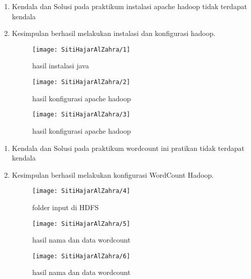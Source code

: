 
\begin{enumerate}
\item Kendala dan Solusi
\newline pada praktikum instalasi apache hadoop tidak terdapat kendala 

\item Kesimpulan
\newline berhasil melakukan instalasi dan konfigurasi hadoop.
\begin{figure}[!ht]
\texttt{[image: SitiHajarAlZahra/1]}
\caption{hasil instalasi java}
\label{gam:Hasil}
\end{figure}

\begin{figure}[!ht]
\texttt{[image: SitiHajarAlZahra/2]}
\caption{hasil konfigurasi apache hadoop}
\label{gam:Hasil}
\end{figure}

\begin{figure}[!ht]
\texttt{[image: SitiHajarAlZahra/3]}
\caption{hasil konfigurasi apache hadoop}
\label{gam:Hasil}
\end{figure}


\end{enumerate}

\begin{enumerate}
\item Kendala dan Solusi
\newline pada praktikum wordcount ini pratikan tidak terdapat kendala 

\item Kesimpulan
\newline berhasil melakukan konfigurasi WordCount Hadoop.
\begin{figure}[!ht]
\texttt{[image: SitiHajarAlZahra/4]}
\caption{ folder input di HDFS}
\label{gam:Hasil}
\end{figure}

\begin{figure}[!ht]
\texttt{[image: SitiHajarAlZahra/5]}
\caption{hasil nama dan data wordcount}
\label{gam:Hasil}
\end{figure}

\begin{figure}[!ht]
\texttt{[image: SitiHajarAlZahra/6]}
\caption{hasil nama dan data wordcount}
\label{gam:Hasil}
\end{figure}
\end{enumerate}

